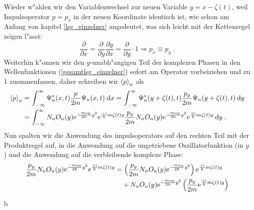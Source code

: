     Wieder w"ahlen wir den Variablenwechsel zur neuen Variable $y=x-\zeta(t)$, weil Impulsoperator $p=p_x$ in der neuen Koordinate identisch ist, wie schon am Anfang von kapitel \ref{lsg_einzelner} angedeutet, was sich leicht mit der Kettenregel zeigen l"asst:
    \begin{equation}
      \frac{\partial}{\partial x} = \frac{\partial}{\partial y}\frac{\partial y}{\partial x} = \frac{\partial}{\partial y} \cdot 1 \Rightarrow p_x \equiv p_y \; .
    \end{equation}
    Weiterhin k"onnen wir den $y$-unabh"angigen Teil der komplexen Phasen in den Wellenfunktionen (\ref{gesamtlsg_einzelner}) sofort am Operator vorbeiziehen und zu 1 zusmmenfassen, daher schreiben wir $\braket{p}_n$ als
    \begin{align}
      \braket{p}_n &= \int_{-\infty}^{\infty} \Psi^*_n(x,t) \frac{p}{2m} \Psi_n(x,t) \; \text dx
      = \int_{-\infty}^{\infty} \Psi^*_n(y+\zeta(t),t) \frac{p_y}{2m} \Psi_n(y+\zeta(t),t) \: \text dy \notag\\
      &= \int_{-\infty}^{\infty} N_nO_n(y)\text e^{\frac{-m\omega_0}{2\hbar}y^2}\text e^{\frac{-\text i}{\hbar}m\zeta(t)y} \frac{p_y}{2m} N_nO_n(y)\text e^{\frac{-m\omega_0}{2\hbar}y^2}\text e^{\frac{+\text i}{\hbar}m\zeta(t)y} \: \text dy \; .
    \end{align}
    Nun spalten wir die Anwendung des impulsoperators auf den rechten Teil mit der Produktregel auf, in die Anwendung auf die ungetriebene Oszillatorfunktion (in $y$) und die Anwendung auf die verbleibende komplexe Phase:
    \begin{align}
      \frac{p_y}{2m} N_nO_n(y)\text e^{\frac{-m\omega_0}{2\hbar}y^2}\text e^{\frac{+\text i}{\hbar}m\zeta(t)y}
      &= \left(\frac{p_y}{2m} N_nO_n(y)\text e^{\frac{-m\omega_0}{2\hbar}y^2}\right) \text e^{\frac{+\text i}{\hbar}m\zeta(t)y} \notag\\
      &\quad + N_nO_n(y)\text e^{\frac{-m\omega_0}{2\hbar}y^2} \left(\frac{p_y}{2m} \text e^{\frac{+\text i}{\hbar}m\zeta(t)y}\right) \notag\\
    \end{align}














































   b
